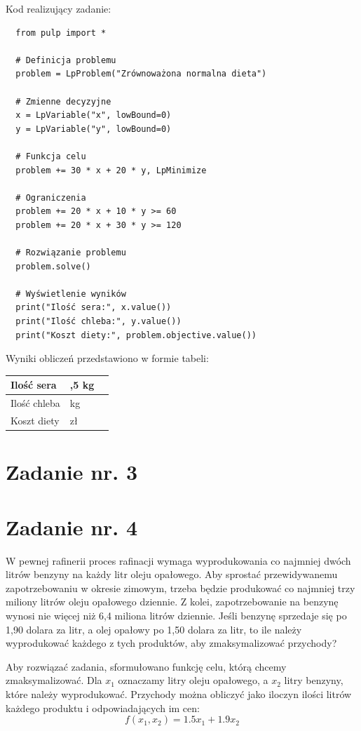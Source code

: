 \documentclass{article}
\begin{document}
Kod realizujący zadanie:
\begin{lstlisting}
  from pulp import *

  # Definicja problemu
  problem = LpProblem("Zrównoważona normalna dieta")
  
  # Zmienne decyzyjne
  x = LpVariable("x", lowBound=0)
  y = LpVariable("y", lowBound=0)
  
  # Funkcja celu
  problem += 30 * x + 20 * y, LpMinimize
  
  # Ograniczenia
  problem += 20 * x + 10 * y >= 60
  problem += 20 * x + 30 * y >= 120
  
  # Rozwiązanie problemu
  problem.solve()
  
  # Wyświetlenie wyników
  print("Ilość sera:", x.value())
  print("Ilość chleba:", y.value())
  print("Koszt diety:", problem.objective.value())
\end{lstlisting}


Wyniki obliczeń przedstawiono w formie tabeli:

\begin{tabularx}{0.8\textwidth} { 
  | >{\raggedright\arraybackslash}X 
  | >{\centering\arraybackslash}X 
  | >{\raggedleft\arraybackslash}X | }
 \hline
 Ilość sera & 1,5 kg  \\
 \hline
 Ilość chleba  & 3 kg  \\
 \hline
 Koszt diety  & 105 zł  \\
\hline
\end{tabularx}

\section{Zadanie nr. 3}

\section{Zadanie nr. 4}
W pewnej rafinerii proces rafinacji wymaga wyprodukowania co najmniej dwóch
litrów benzyny na każdy litr oleju opałowego. Aby sprostać przewidywanemu zapotrzebowaniu
w okresie zimowym, trzeba będzie produkować co najmniej trzy miliony litrów oleju
opałowego dziennie. Z kolei, zapotrzebowanie na benzynę wynosi nie więcej niż 6,4 miliona
litrów dziennie. Jeśli benzynę sprzedaje się po 1,90 dolara za litr, a olej opałowy po 1,50 dolara
za litr, to ile należy wyprodukować każdego z tych produktów, aby zmaksymalizować
przychody?
\newline

Aby rozwiązać zadania, sformułowano funkcję celu, którą chcemy zmaksymalizować. Dla $x_1$ oznaczamy litry oleju opałowego, 
a $x_2$ litry benzyny, które należy wyprodukować. Przychody można obliczyć jako iloczyn ilości litrów każdego produktu i odpowiadających im cen:
\begin{equation}
   f(x_1,x_2)=1.5x_1 + 1.9x_2 
\end{equation}
\end{document}
